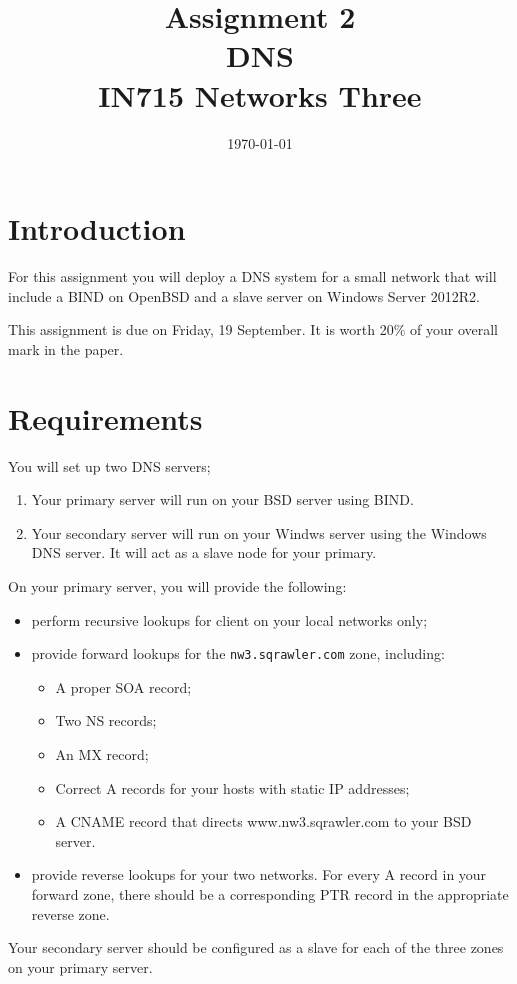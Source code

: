 \documentclass{article}
\begin{document}
\title{ Assignment 2 \\ DNS \\ IN715 Networks Three}
\date{\today}
\maketitle

\section*{Introduction}
For this assignment you will deploy a DNS system for a small network that will include a BIND on OpenBSD and a slave server on Windows Server 2012R2.

This assignment is due on Friday, 19 September.  It is worth 20\% of your overall mark in the paper.

\section{Requirements}
You will set up two DNS servers;
  \begin{enumerate}
    \item Your primary server will run on your BSD server using BIND.
    \item Your secondary server will run on your Windws server using the 
          Windows DNS server.  It will act as a slave node for your primary.
  \end{enumerate}

On your primary server, you will provide the following:
\begin{itemize}
    \item perform recursive lookups for client on your local networks only;
    \item provide forward lookups for the \texttt{nw3.sqrawler.com} zone, 
          including:
          \begin{itemize}
            \item A proper SOA record;
            \item Two NS records;
            \item An MX record;
            \item Correct A records for your hosts with static IP addresses;
            \item A CNAME record that directs www.nw3.sqrawler.com to your
                  BSD server.
          \end{itemize}
    \item provide reverse lookups for your two networks.  For every A record 
          in your forward zone, there should be a corresponding PTR record 
          in the appropriate reverse zone.
\end{itemize}
Your secondary server should be configured as a slave for each of the three zones on your primary server.
\end{document}
